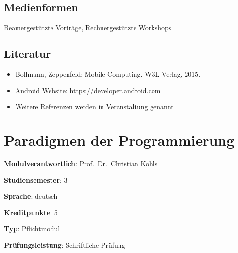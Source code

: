 \hypertarget{medienformenpathlabelmi-2017modulbeschreibungen-bachelorba_mobile-computing}{%
\section*{Medienformen\label{/mi-2017/modulbeschreibungen-bachelor/BA_Mobile-Computing}}\label{medienformenpathlabelmi-2017modulbeschreibungen-bachelorba_mobile-computing}}

Beamergestützte Vorträge, Rechnergestützte Workshops

\hypertarget{literaturpathlabelmi-2017modulbeschreibungen-bachelorba_mobile-computing}{%
\section*{Literatur\label{/mi-2017/modulbeschreibungen-bachelor/BA_Mobile-Computing}}\label{literaturpathlabelmi-2017modulbeschreibungen-bachelorba_mobile-computing}}

\begin{itemize}
\tightlist
\item
  Bollmann, Zeppenfeld: Mobile Computing. W3L Verlag, 2015.
\item
  Android Website: https://developer.android.com
\item
  Weitere Referenzen werden in Veranstaltung genannt
\end{itemize}

\hypertarget{paradigmen-der-programmierungpathlabelmi-2017modulbeschreibungen-bachelorba_paradigmen-der-programmierung}{%
\chapter{Paradigmen der
Programmierung\label{/mi-2017/modulbeschreibungen-bachelor/BA_Paradigmen-der-Programmierung}}\label{paradigmen-der-programmierungpathlabelmi-2017modulbeschreibungen-bachelorba_paradigmen-der-programmierung}}

\begin{modulHead}
\textbf{Modulverantwortlich}: Prof.~Dr.~Christian
Kohls
\end{modulHead}
\begin{modulHead}
\textbf{Studiensemester}:
3
\end{modulHead}
\begin{modulHead}
\textbf{Sprache}:
deutsch
\end{modulHead}
\begin{modulHead}
\textbf{Kreditpunkte}:
5
\end{modulHead}
\begin{modulHead}
\textbf{Typ}:
Pflichtmodul
\end{modulHead}
\begin{modulHead}
\textbf{Prüfungsleistung}:
Schriftliche Prüfung
\end{modulHead}


